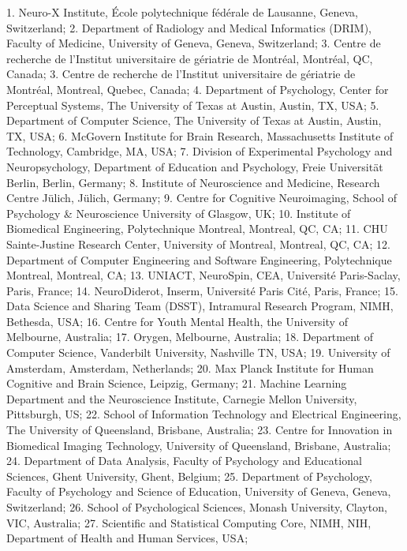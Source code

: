 \documentclass[10pt,a4paper,twocolumns]{proc}
\newcommand{\affiliations}[1]{{\scriptsize #1} \\}
\begin{document}
\affiliations{1. Neuro-X Institute, École polytechnique fédérale de Lausanne, Geneva, Switzerland; %
2. Department of Radiology and Medical Informatics (DRIM), Faculty of Medicine, University of Geneva, Geneva, Switzerland; %
3. Centre de recherche de l'Institut universitaire de gériatrie de Montréal, Montréal, QC, Canada; %
3. Centre de recherche de l'Institut universitaire de gériatrie de Montréal, Montreal, Quebec, Canada; %
4. Department of Psychology, Center for Perceptual Systems, The University of Texas at Austin, Austin, TX, USA; %
5. Department of Computer Science, The University of Texas at Austin, Austin, TX, USA; %
6. McGovern Institute for Brain Research, Massachusetts Institute of Technology, Cambridge, MA, USA; %
7. Division of Experimental Psychology and Neuropsychology, Department of Education and Psychology, Freie Universität Berlin, Berlin, Germany; %
8. Institute of Neuroscience and Medicine, Research Centre Jülich, Jülich, Germany; %
9. Centre for Cognitive Neuroimaging, School of Psychology & Neuroscience University of Glasgow, UK; %
10. Institute of Biomedical Engineering, Polytechnique Montreal, Montreal, QC, CA; %
11. CHU Sainte-Justine Research Center, University of Montreal, Montreal, QC, CA; %
12. Department of Computer Engineering and Software Engineering, Polytechnique Montreal, Montreal, CA; %
13. UNIACT, NeuroSpin, CEA, Université Paris-Saclay, Paris, France; %
14. NeuroDiderot, Inserm, Université Paris Cité, Paris, France; %
15. Data Science and Sharing Team (DSST), Intramural Research Program, NIMH, Bethesda, USA; %
16. Centre for Youth Mental Health, the University of Melbourne, Australia; %
17. Orygen, Melbourne, Australia; %
18. Department of Computer Science, Vanderbilt University, Nashville TN, USA; %
19. University of Amsterdam, Amsterdam, Netherlands; %
20. Max Planck Institute for Human Cognitive and Brain Science, Leipzig, Germany; %
21. Machine Learning Department and the Neuroscience Institute, Carnegie Mellon University, Pittsburgh, US; %
22. School of Information Technology and Electrical Engineering, The University of Queensland, Brisbane, Australia; %
23. Centre for Innovation in Biomedical Imaging Technology, University of Queensland, Brisbane, Australia; %
24. Department of Data Analysis, Faculty of Psychology and Educational Sciences, Ghent University, Ghent, Belgium; %
25. Department of Psychology, Faculty of Psychology and Science of Education, University of Geneva, Geneva, Switzerland; %
26. School of Psychological Sciences, Monash University, Clayton, VIC, Australia; %
27. Scientific and Statistical Computing Core, NIMH, NIH, Department of Health and Human Services, USA; %
}
\end{document}
